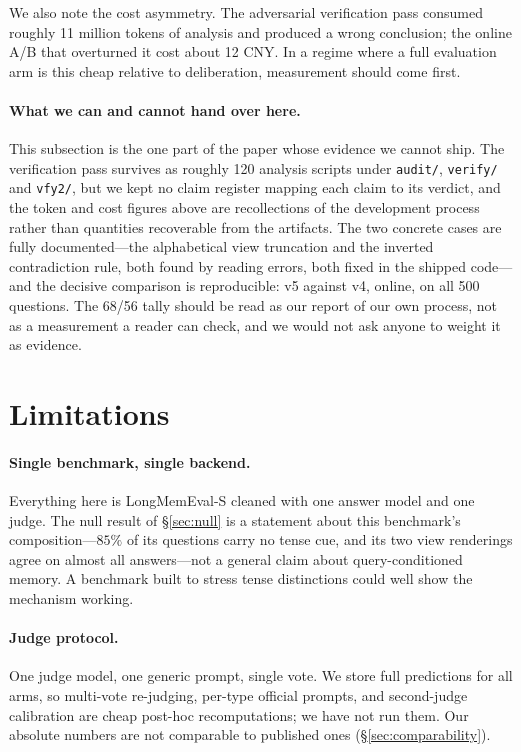 \documentclass[11pt]{article}
\begin{document}
We also note the cost asymmetry. The adversarial verification pass consumed roughly 11 million tokens of analysis and produced a wrong conclusion; the online A/B that overturned it cost about 12 CNY. In a regime where a full evaluation arm is this cheap relative to deliberation, measurement should come first.

\paragraph{What we can and cannot hand over here.} This subsection is the one part of the paper whose evidence we cannot ship. The verification pass survives as roughly 120 analysis scripts under \texttt{audit/}, \texttt{verify/} and \texttt{vfy2/}, but we kept no claim register mapping each claim to its verdict, and the token and cost figures above are recollections of the development process rather than quantities recoverable from the artifacts. The two concrete cases are fully documented---the alphabetical view truncation and the inverted contradiction rule, both found by reading errors, both fixed in the shipped code---and the decisive comparison is reproducible: v5 against v4, online, on all 500 questions. The 68/56 tally should be read as our report of our own process, not as a measurement a reader can check, and we would not ask anyone to weight it as evidence.

\section{Limitations}
\label{sec:limitations}

\paragraph{Single benchmark, single backend.} Everything here is LongMemEval-S cleaned with one answer model and one judge. The null result of \S\ref{sec:null} is a statement about this benchmark's composition---$85\%$ of its questions carry no tense cue, and its two view renderings agree on almost all answers---not a general claim about query-conditioned memory. A benchmark built to stress tense distinctions could well show the mechanism working.

\paragraph{Judge protocol.} One judge model, one generic prompt, single vote. We store full predictions for all arms, so multi-vote re-judging, per-type official prompts, and second-judge calibration are cheap post-hoc recomputations; we have not run them. Our absolute numbers are not comparable to published ones (\S\ref{sec:comparability}).
\end{document}
